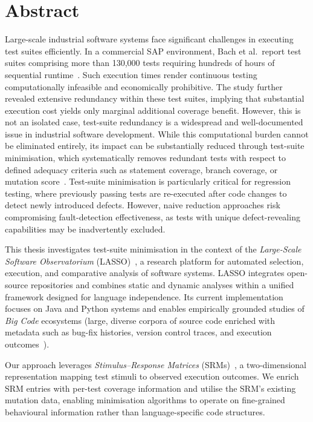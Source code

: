 \chapter{Abstract}

Large-scale industrial software systems face significant challenges in executing test suites efficiently. In a commercial SAP environment, Bach et al.\ report test suites comprising more than 130,000 tests requiring hundreds of hours of sequential runtime~\cite{bach2017}. Such execution times render continuous testing computationally infeasible and economically prohibitive. The study further revealed extensive redundancy within these test suites, implying that substantial execution cost yields only marginal additional coverage benefit. However, this is not an isolated case, test-suite redundancy is a widespread and well-documented issue in industrial software development. While this computational burden cannot be eliminated entirely, its impact can be substantially reduced through test-suite minimisation, which systematically removes redundant tests with respect to defined adequacy criteria such as statement coverage, branch coverage, or mutation score~\cite{yoo2012}. Test-suite minimisation is particularly critical for regression testing, where previously passing tests are re-executed after code changes to detect newly introduced defects. However, naive reduction approaches risk compromising fault-detection effectiveness, as tests with unique defect-revealing capabilities may be inadvertently excluded.

This thesis investigates test-suite minimisation in the context of the \emph{Large-Scale Software Observatorium} (LASSO)~\cite{Kessel2022}, a research platform for automated selection, execution, and comparative analysis of software systems. LASSO integrates open-source repositories and combines static and dynamic analyses within a unified framework designed for language independence. Its current implementation focuses on Java and Python systems and enables empirically grounded studies of \emph{Big Code} ecosystems (large, diverse corpora of source code enriched with metadata such as bug-fix histories, version control traces, and execution outcomes~\cite{allamanis2018}).

Our approach leverages \emph{Stimulus--Response Matrices} (SRMs)~\cite{Kessel2022}, a two-dimensional representation mapping test stimuli to observed execution outcomes. We enrich SRM entries with per-test coverage information and utilise the SRM’s existing mutation data, enabling minimisation algorithms to operate on fine-grained behavioural information rather than language-specific code structures.

